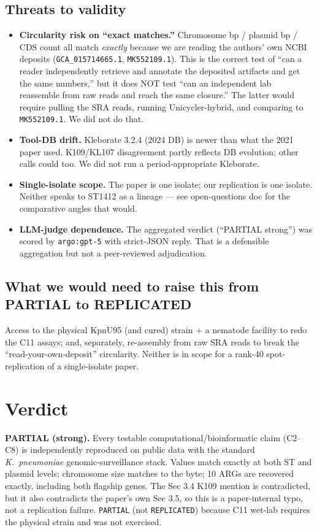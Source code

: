 \documentclass[11pt]{article}
\begin{document}
\subsection{Threats to validity}
\begin{itemize}
  \item \textbf{Circularity risk on ``exact matches.''} Chromosome bp / plasmid bp / CDS count all match \emph{exactly} because we are reading the authors' own NCBI deposits (\texttt{GCA\_015714665.1}, \texttt{MK552109.1}). This is the correct test of ``can a reader independently retrieve and annotate the deposited artifacts and get the same numbers,'' but it does NOT test ``can an independent lab reassemble from raw reads and reach the same closure.'' The latter would require pulling the SRA reads, running Unicycler-hybrid, and comparing to \texttt{MK552109.1}. We did not do that.
  \item \textbf{Tool-DB drift.} Kleborate 3.2.4 (2024 DB) is newer than what the 2021 paper used. K109/KL107 disagreement partly reflects DB evolution; other calls could too. We did not run a period-appropriate Kleborate.
  \item \textbf{Single-isolate scope.} The paper is one isolate; our replication is one isolate. Neither speaks to ST1412 as a lineage --- see open-questions doc for the comparative angles that would.
  \item \textbf{LLM-judge dependence.} The aggregated verdict (``PARTIAL strong'') was scored by \texttt{argo:gpt-5} with strict-JSON reply. That is a defensible aggregation but not a peer-reviewed adjudication.
\end{itemize}

\subsection{What we would need to raise this from PARTIAL to REPLICATED}
Access to the physical KpnU95 (and cured) strain + a nematode facility to redo the C11 assays; and, separately, re-assembly from raw SRA reads to break the ``read-your-own-deposit'' circularity. Neither is in scope for a rank-40 spot-replication of a single-isolate paper.

\section{Verdict}
\textbf{PARTIAL (strong).} Every testable computational/bioinformatic claim (C2--C8) is independently reproduced on public data with the standard \textit{K.\ pneumoniae} genomic-surveillance stack. Values match exactly at both ST and plasmid levels; chromosome size matches to the byte; 10 ARGs are recovered exactly, including both flagship genes. The Sec 3.4 K109 mention is contradicted, but it also contradicts the paper's own Sec 3.5, so this is a paper-internal typo, not a replication failure. \texttt{PARTIAL} (not \texttt{REPLICATED}) because C11 wet-lab requires the physical strain and was not exercised.
\end{document}
